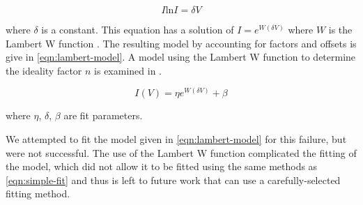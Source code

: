 \documentclass[reprint]{revtex4-1}
\begin{document}
\begin{equation}
I \mathrm{ln} I = \delta V 
\end{equation}

where $\delta$ is a constant. This equation has a solution of $I = e^{W\left(\delta V \right)}$ where $W$ is the Lambert W function \cite{lambertW}. The resulting model by accounting for factors and offsets is give in \cref{eqn:lambert-model}. A model using the Lambert W function to determine the ideality factor $n$ is examined in \cite{Jain2005}.

\begin{equation}
I(V) = \eta e^{W \left(\delta V\right)} + \beta
\label{eqn:lambert-model}
\end{equation}

where $\eta$, $\delta$, $\beta$ are fit parameters.

We attempted to fit the model given in \cref{eqn:lambert-model} for this failure, but were not successful. The use of the Lambert W function complicated the fitting of the model, which did not allow it to be fitted using the same methods as \cref{eqn:simple-fit} and thus is left to future work that can use a carefully-selected fitting method.



\end{document}
